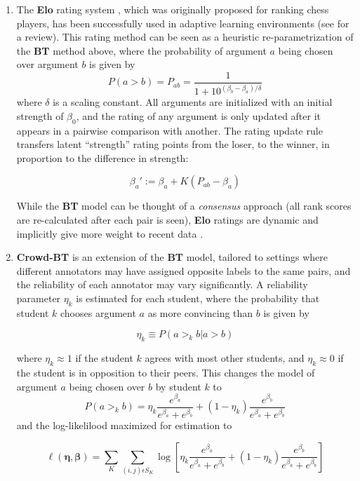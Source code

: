 \documentclass[notitlepage,12pt]{jedm}
\begin{document}
\begin{enumerate}
	
	\item The \textbf{Elo} rating system \cite{elo_rating_1978}, which was 
	originally proposed for ranking chess players, has been successfully used 
	in adaptive learning environments (see \cite{pelanek_applications_2016} for 
	a review). 
	This rating method can be seen as a heuristic re-parametrization of the 
	\textbf{BT} method above, where the probability of argument $a$ being 
	chosen over argument $b$ is given by
	$$
	P(a>b) = P_{ab} = \frac{1}{1+10^{(\beta_b-\beta_a)/\delta}}
	$$
	where $\delta$ is a scaling constant. 
	All arguments are initialized with an initial strength of $\beta_0$, and 
	the rating of any argument is only updated after it appears in a pairwise 
	comparison with another.
	The rating update rule transfers latent ``strength'' rating points from the 
	loser, to the winner, in proportion to the difference in strength:
	
	$$
	\beta_a':=\beta_a+K(P_{ab} - \beta_a)
	$$
	
	While the \textbf{BT} model can be thought of a \textit{consensus} 
	approach (all rank scores are re-calculated after each pair is seen), 
	\textbf{Elo} ratings are dynamic and implicitly give more weight 
	to recent data \cite{aldous_elo_2017}.
	
	\item \textbf{Crowd-BT} \cite{chen_pairwise_2013} is an extension of the 
	\textbf{BT} model, tailored to settings where different annotators may have 
	assigned opposite labels to the same pairs, and the reliability of each 
	annotator may vary significantly. 
	A reliability parameter $\eta_k$ is estimated for each student, where the 
	probability that student $k$ chooses argument $a$ as more convincing than 
	$b$ is given by 
	
	$$
	\eta_k \equiv P(a >_k b | a >b )
	$$
	
	where $\eta_k \approx 1$ if the student  $k$ agrees with most other 
	students, and $\eta_k \approx 0$ if the student is in opposition to their 
	peers.
	This changes the model of argument $a$ being chosen over $b$ by student $k$ 
	to 
	$$
	P(a >_k b) = 
	\eta_k \frac{e^{\beta_a}}{e^{\beta_a}+e^{\beta_b}} + (1-\eta_k) 
	\frac{e^{\beta_b}}{e^{\beta_a}+e^{\beta_b}}
	$$
	and the log-likelilood maximized for estimation to 
	
	$$
	\ell(\boldsymbol{\eta},\boldsymbol{\beta})=\sum_{K}\sum_{(i,j)\epsilon 
		S_K}^{} 
	\log \left[ \eta_k \frac{e^{\beta_a}}{e^{\beta_a}+e^{\beta_b}} + (1-\eta_k) 
	\frac{e^{\beta_b}}{e^{\beta_a}+e^{\beta_b}} \right]
	$$
	
\end{enumerate}
\end{document}
